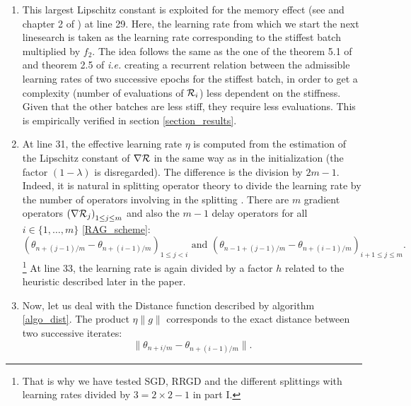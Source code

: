 \begin{enumerate}
	\item This largest Lipschitz constant is exploited for the memory effect (see \cite{Lyap_Theory_Bilel,Bilel_ICML} and chapter 2 of \cite{Bilel_thesis}) at line 29. Here, the learning rate from
          which we start the next linesearch is taken as the learning rate corresponding to the stiffest batch multiplied by $f_2$. The idea follows the same as the one of the
          theorem 5.1 of \cite{Bilel_ICML} and theorem 2.5 of \cite{Bilel_thesis} {\it i.e.} creating a recurrent relation between the admissible learning rates of two successive
          epochs for the stiffest batch, in order to get a complexity (number of evaluations of $\mathcal{R}_i$) less dependent on the stiffness. Given that the other batches are less
          stiff, they require less evaluations. This is empirically verified in section \ref{section_results}.
	\item At line 31, the effective learning rate $\eta$ is computed from the estimation of the Lipschitz constant of $\nabla \mathcal{R}$ in the same way as in the initialization (the factor $(1-\lambda)$ is disregarded). The difference is the division by $2m-1$. Indeed, it is natural in splitting operator theory to divide the learning rate by the number of operators involving in the splitting \cite{splitting_ode_review}. There are $m$ gradient operators $\left(\nabla \mathcal{R}_j\right)_{1 \leq j \leq m}$ and also the $m-1$ delay operators for all $i \in \{1,\dots,m\}$ \eqref{RAG_scheme}:
	\begin{equation*}
		\left(\theta_{n+(j-1)/m}-\theta_{n+(i-1)/m}\right)_{1\leq j <i} \text{ and } \left(\theta_{n-1+(j-1)/m}-\theta_{n+(i-1)/m}\right)_{i+1\leq j \leq m}.
	\end{equation*}
	\footnote{That is why we have tested SGD, RRGD and the different splittings with learning rates divided by $3=2\times 2-1$ in part I.} 
        At line 33, the learning rate is again divided by a factor $h$ related to the heuristic described later in the paper. 
	\item Now, let us deal with the Distance function described by algorithm \ref{algo_dist}. The product $\eta \|g\|$ corresponds to the exact distance between two successive iterates:
	\begin{equation*}
		\|\theta_{n+i/m}-\theta_{n+(i-1)/m}\|.
	\end{equation*}

\end{enumerate}
